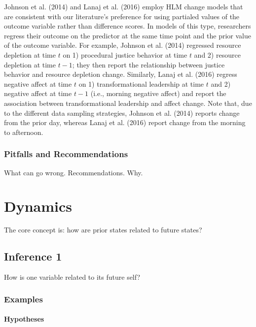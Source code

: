 \documentclass[english,,man]{apa6}
\let\oldparagraph\paragraph
\renewcommand{\paragraph}[1]{\oldparagraph{#1}\mbox{}}
\theoremstyle{definition}
\theoremstyle{definition}
\theoremstyle{definition}
\theoremstyle{remark}
\begin{document}
Johnson et al. (2014) and Lanaj et al. (2016) employ HLM change models
that are consistent with our literature's preference for using partialed
values of the outcome variable rather than difference scores. In models
of this type, researchers regress their outcome on the predictor at the
same time point and the prior value of the outcome variable. For
example, Johnson et al. (2014) regressed resource depletion at time
\(t\) on 1) procedural justice behavior at time \(t\) and 2) resource
depletion at time \(t-1\); they then report the relationship between
justice behavior and resource depletion change. Similarly, Lanaj et al.
(2016) regress negative affect at time \(t\) on 1) transformational
leadership at time \(t\) and 2) negative affect at time \(t-1\) (i.e.,
morning negative affect) and report the association between
transformational leadership and affect change. Note that, due to the
different data sampling strategies, Johnson et al. (2014) reports change
from the prior day, whereas Lanaj et al. (2016) report change from the
morning to afternoon.

\hypertarget{pitfalls-and-recommendations-6}{%
\subsubsection{Pitfalls and
Recommendations}\label{pitfalls-and-recommendations-6}}

What can go wrong. Recommendations. Why.

\hypertarget{dynamics}{%
\section{Dynamics}\label{dynamics}}

The core concept is: how are prior states related to future states?

\hypertarget{inference-1-2}{%
\subsection{Inference 1}\label{inference-1-2}}

How is one variable related to its future self?

\hypertarget{examples-6}{%
\subsubsection{Examples}\label{examples-6}}

\hypertarget{hypotheses-7}{%
\paragraph{Hypotheses}\label{hypotheses-7}}
\end{document}
